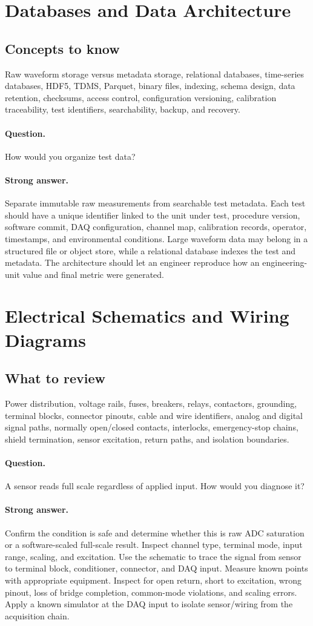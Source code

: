 \documentclass[11pt]{article}
\newcommand{\q}[1]{\paragraph{Question.} #1}
\newcommand{\ans}[1]{\paragraph{Strong answer.} #1}
\begin{document}
\section{Databases and Data Architecture}

\subsection{Concepts to know}
Raw waveform storage versus metadata storage, relational databases, time-series
databases, HDF5, TDMS, Parquet, binary files, indexing, schema design, data
retention, checksums, access control, configuration versioning, calibration
traceability, test identifiers, searchability, backup, and recovery.

\q{How would you organize test data?}
\ans{Separate immutable raw measurements from searchable test metadata. Each test
should have a unique identifier linked to the unit under test, procedure version,
software commit, DAQ configuration, channel map, calibration records, operator,
timestamps, and environmental conditions. Large waveform data may belong in a
structured file or object store, while a relational database indexes the test and
metadata. The architecture should let an engineer reproduce how an
engineering-unit value and final metric were generated.}

\section{Electrical Schematics and Wiring Diagrams}

\subsection{What to review}
Power distribution, voltage rails, fuses, breakers, relays, contactors,
grounding, terminal blocks, connector pinouts, cable and wire identifiers,
analog and digital signal paths, normally open/closed contacts, interlocks,
emergency-stop chains, shield termination, sensor excitation, return paths, and
isolation boundaries.

\q{A sensor reads full scale regardless of applied input. How would you diagnose it?}
\ans{Confirm the condition is safe and determine whether this is raw ADC saturation
or a software-scaled full-scale result. Inspect channel type, terminal mode,
input range, scaling, and excitation. Use the schematic to trace the signal from
sensor to terminal block, conditioner, connector, and DAQ input. Measure known
points with appropriate equipment. Inspect for open return, short to excitation,
wrong pinout, loss of bridge completion, common-mode violations, and scaling
errors. Apply a known simulator at the DAQ input to isolate sensor/wiring from
the acquisition chain.}
\end{document}
